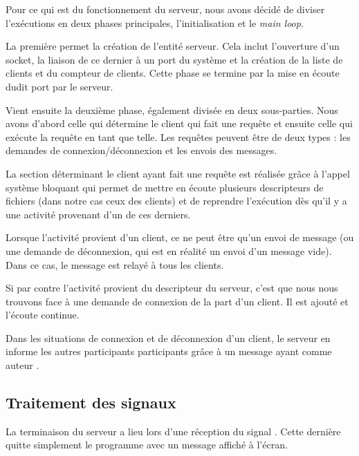Pour ce qui est du fonctionnement du serveur,
nous avons décidé de diviser l'exécutions en deux phases
principales, l'initialisation et le \emph{main loop}.

La première permet la création de l'entité serveur. Cela
inclut l'ouverture d'un socket, la liaison de ce dernier à
un port du système et la création de la liste de clients et du
compteur de clients. Cette phase se termine par la mise en
écoute dudit port par le serveur.

Vient ensuite la deuxième phase, également divisée en deux
sous-parties. Nous avons d'abord celle qui détermine le
client qui fait une requête et ensuite celle qui exécute la requête
en tant que telle. Les requêtes peuvent être de deux types :
les demandes de connexion/déconnexion et les envois des
messages.

La section déterminant le client ayant fait une requête est
réalisée grâce à l'appel système bloquant \verb@select@ qui permet de
mettre en écoute plusieurs descripteurs de fichiers (dans
notre cas ceux des clients) et de reprendre l'exécution dès
qu'il y a une activité provenant d'un de ces derniers.

Lorsque l'activité provient d'un client, ce ne peut être
qu'un envoi de message (ou une demande de déconnexion, qui
est en réalité un envoi d'un message vide). Dans ce cas, le
message est relayé à tous les clients.

Si par contre l'activité provient du descripteur du serveur,
c'est que nous nous trouvons face à une demande de connexion de la
part d'un client. Il est ajouté et l'écoute continue.

Dans les situations de connexion et de déconnexion d'un
client, le serveur en informe les autres participants participants
grâce à un message ayant comme auteur \verb@Serveur@.

\subsection{Traitement des signaux}

La terminaison du serveur a lieu lors d'une réception du
signal \verb@SIGINT@. Cette dernière quitte simplement le
programme avec un message affiché à l'écran.
